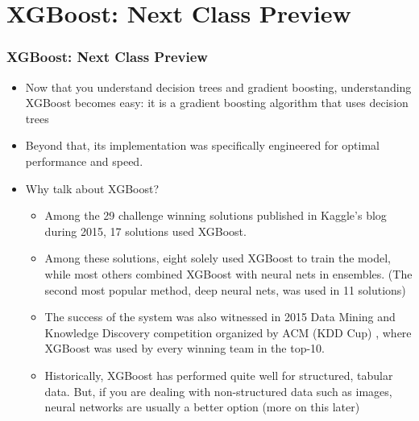 \documentclass[
  shownotes,
  xcolor={svgnames},
  hyperref={colorlinks,citecolor=DarkBlue,linkcolor=DarkRed,urlcolor=DarkBlue}
  , aspectratio=169]{beamer}
\begin{document}
\section{XGBoost: Next Class Preview}
\begin{frame}[fragile]
\frametitle{XGBoost: Next Class Preview}

\begin{itemize}


\item Now that you understand decision trees and gradient boosting, understanding XGBoost becomes easy: it is a gradient boosting algorithm that uses decision trees 
\item Beyond that, its implementation was specifically engineered for optimal performance and speed.



\item Why talk about XGBoost?
\begin{itemize}


 \item Among the 29 challenge winning solutions published in Kaggle's blog during 2015, 17 solutions used XGBoost.  
 \item Among these solutions,  eight  solely  used  XGBoost  to  train  the  model, while most others combined XGBoost with neural nets in ensembles. (The second most popular method, deep  neural  nets,  was  used  in  11  solutions) 
 \item   The  success of the system was also witnessed in 2015 Data Mining and Knowledge Discovery competition organized by ACM (KDD Cup) , where XGBoost  was  used  by  every  winning  team  in  the  top-10. 
 \item Historically, XGBoost has performed quite well for structured, tabular data. But, if you are dealing with non-structured data such as images, neural networks are usually a better option (more on this later)
\end{itemize}
 \end{itemize}
\end{frame}






\end{document}
